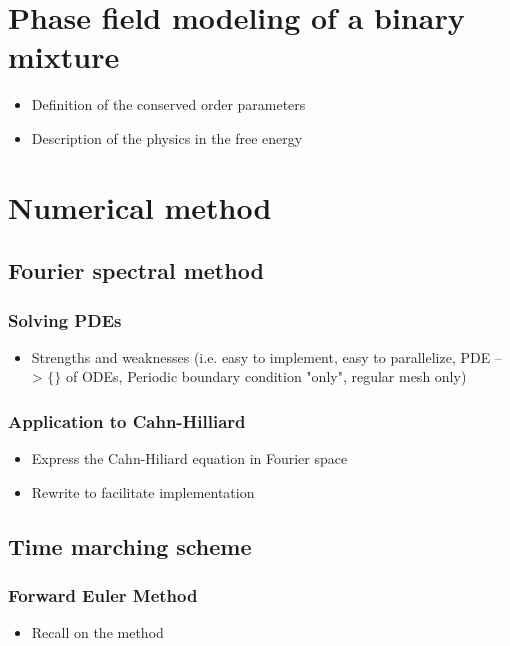 \section{Phase field modeling of a binary mixture}
        \begin{itemize}
            \item Definition of the conserved order parameters
            \item Description of the physics in the free energy
        \end{itemize}
\section{Numerical method}
    \subsection{Fourier spectral method}
        \subsubsection{Solving PDEs}
        \begin{itemize}
            \item Strengths and weaknesses (i.e. easy to implement, easy to parallelize, PDE --> $\{\}$ of ODEs, Periodic boundary condition "only", regular mesh only)
        \end{itemize}
        \subsubsection{Application to Cahn-Hilliard}
        \begin{itemize}
            \item Express the Cahn-Hiliard equation in Fourier space
            \item Rewrite to facilitate implementation
        \end{itemize}
    \subsection{Time marching scheme}
        \subsubsection{Forward Euler Method}
        \begin{itemize}
            \item Recall on the method
        \end{itemize}
